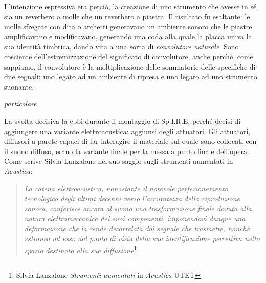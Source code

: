 L'intenzione espressiva era perciò, la creazione di uno strumento che avesse in sé sia un reverbero a molle che un reverbero a piastra. Il risultato fu esaltante: le molle sfregate con dita o archetti generavano un ambiente sonoro che le piastre amplificavano e modificavano, generando una coda alla quale la placca univa la sua identità timbrica, dando vita a una sorta di \textit{convolutore naturale}. Sono cosciente dell'estremizzazione del significato di convolutore, anche perché, come sappiamo, il convolutore è la moltiplicazione delle sommatorie delle specifiche di due segnali: uno legato ad un ambiente di ripresa e uno legato ad uno strumento suonante. \\
\begin{floatingfigure}{10cm}
\mbox{}
\small{\caption{\textit{particolare}}}
\end{floatingfigure}
La svolta decisiva la ebbi durante il montaggio di Sp.I.R.E. perché decisi di aggiungere una variante elettroacustica: aggiunsi degli attuatori. Gli attuatori, diffusori a parete capaci di far interagire il materiale sul quale sono collocati con il suono diffuso, erano la variante finale per la messa a punto finale dell'opera.
Come scrive Silvia Lanzalone nel suo saggio sugli strumenti aumentati in \textit{Acustica}:
\begin{quotation}
\textit{La catena elettroacustica, nonostante il notevole perfezionamento tecnologico degli ultimi decenni verso l'accuratezza della riproduzione sonora, conferisce ancora al suono una trasformazione finale dovuta alla natura elettromeccanica dei suoi componenti, imponendovi dunque una deformazione che la rende decorrelata dal segnale che trasmette, nonché estranea ad esso dal punto di vista della sua identificazione percettiva nello spazio destinato alla sua diffusione}\footnote{Silvia Lanzalone \textit{Strumenti aumentati} in \textit{Acustica} UTET}.
\end{quotation} 

